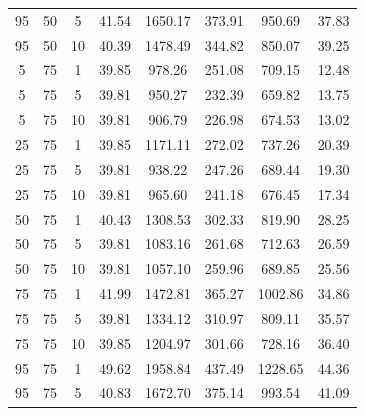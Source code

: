 \begin{table}[H]
\begin{tabular}{ccc|c|c|c|c|c}
95 & 50 & 5 & \cellcolor{gray!33}41.54 & \cellcolor{gray!1}1650.17 & \cellcolor{gray!1}373.91 & \cellcolor{gray!1}950.69 & 37.83\\
95 & 50 & 10 & \cellcolor{gray!45}40.39 & \cellcolor{gray!1}1478.49 & \cellcolor{gray!1}344.82 & \cellcolor{gray!1}850.07 & 39.25\\
5 & 75 & 1 & \cellcolor{gray!50}39.85 & \cellcolor{gray!8}978.26 & \cellcolor{gray!1}251.08 & \cellcolor{gray!35}709.15 & 12.48\\
5 & 75 & 5 & \cellcolor{gray!50}39.81 & \cellcolor{gray!13}950.27 & \cellcolor{gray!1}232.39 & \cellcolor{gray!50}659.82 & 13.75\\
5 & 75 & 10 & \cellcolor{gray!50}39.81 & \cellcolor{gray!20}906.79 & \cellcolor{gray!3}226.98 & \cellcolor{gray!46}674.53 & 13.02\\
25 & 75 & 1 & \cellcolor{gray!50}39.85 & \cellcolor{gray!1}1171.11 & \cellcolor{gray!1}272.02 & \cellcolor{gray!27}737.26 & 20.39\\
25 & 75 & 5 & \cellcolor{gray!50}39.81 & \cellcolor{gray!15}938.22 & \cellcolor{gray!1}247.26 & \cellcolor{gray!41}689.44 & 19.30\\
25 & 75 & 10 & \cellcolor{gray!50}39.81 & \cellcolor{gray!10}965.60 & \cellcolor{gray!1}241.18 & \cellcolor{gray!45}676.45 & 17.34\\
50 & 75 & 1 & \cellcolor{gray!44}40.43 & \cellcolor{gray!1}1308.53 & \cellcolor{gray!1}302.33 & \cellcolor{gray!1}819.90 & 28.25\\
50 & 75 & 5 & \cellcolor{gray!50}39.81 & \cellcolor{gray!1}1083.16 & \cellcolor{gray!1}261.68 & \cellcolor{gray!34}712.63 & 26.59\\
50 & 75 & 10 & \cellcolor{gray!50}39.81 & \cellcolor{gray!1}1057.10 & \cellcolor{gray!1}259.96 & \cellcolor{gray!41}689.85 & 25.56\\
75 & 75 & 1 & \cellcolor{gray!28}41.99 & \cellcolor{gray!1}1472.81 & \cellcolor{gray!1}365.27 & \cellcolor{gray!1}1002.86 & 34.86\\
75 & 75 & 5 & \cellcolor{gray!50}39.81 & \cellcolor{gray!1}1334.12 & \cellcolor{gray!1}310.97 & \cellcolor{gray!5}809.11 & 35.57\\
75 & 75 & 10 & \cellcolor{gray!50}39.85 & \cellcolor{gray!1}1204.97 & \cellcolor{gray!1}301.66 & \cellcolor{gray!29}728.16 & 36.40\\
95 & 75 & 1 & \cellcolor{gray!1}49.62 & \cellcolor{gray!1}1958.84 & \cellcolor{gray!1}437.49 & \cellcolor{gray!1}1228.65 & 44.36\\
95 & 75 & 5 & \cellcolor{gray!40}40.83 & \cellcolor{gray!1}1672.70 & \cellcolor{gray!1}375.14 & \cellcolor{gray!1}993.54 & 41.09\\

\end{tabular}
\end{table}

